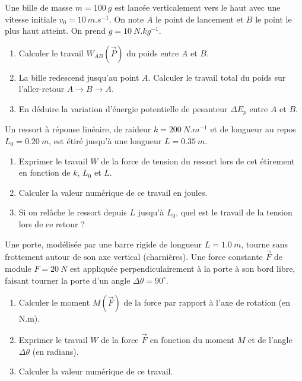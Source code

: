 \documentclass[11pt]{article}
\begin{document}
\begin{exercice}
Une bille de masse $m = \SI{100}{g}$ est lancée verticalement vers le haut avec une vitesse initiale $v_0 = \SI{10}{m.s^{-1}}$. On note $A$ le point de lancement et $B$ le point le plus haut atteint. On prend $g = \SI{10}{N.kg^{-1}}$.
\begin{enumerate}
    \item Calculer le travail $W_{AB}(\vec{P})$ du poids entre $A$ et $B$.
    \item La bille redescend jusqu'au point $A$. Calculer le travail total du poids sur l'aller-retour $A \to B \to A$.
    \item En déduire la variation d'énergie potentielle de pesanteur $\Delta E_p$ entre $A$ et $B$.
\end{enumerate}
\end{exercice}

\begin{exercice}
Un ressort à réponse linéaire, de raideur $k = \SI{200}{N.m^{-1}}$ et de longueur au repos $L_0 = \SI{0,20}{m}$, est étiré jusqu'à une longueur $L = \SI{0,35}{m}$.
\begin{enumerate}
    \item Exprimer le travail $W$ de la force de tension du ressort lors de cet étirement en fonction de $k$, $L_0$ et $L$.
    \item Calculer la valeur numérique de ce travail en joules.
    \item Si on relâche le ressort depuis $L$ jusqu'à $L_0$, quel est le travail de la tension lors de ce retour ?
\end{enumerate}
\end{exercice}

\begin{exercice}
Une porte, modélisée par une barre rigide de longueur $L = \SI{1,0}{m}$, tourne sans frottement autour de son axe vertical (charnières). Une force constante $\vec{F}$ de module $F = \SI{20}{N}$ est appliquée perpendiculairement à la porte à son bord libre, faisant tourner la porte d'un angle $\Delta \theta = 90^\circ$.
\begin{enumerate}
    \item Calculer le moment $M(\vec{F})$ de la force par rapport à l'axe de rotation (en N.m).
    \item Exprimer le travail $W$ de la force $\vec{F}$ en fonction du moment $M$ et de l'angle $\Delta \theta$ (en radians).
    \item Calculer la valeur numérique de ce travail.
\end{enumerate}
\end{exercice}
\end{document}
